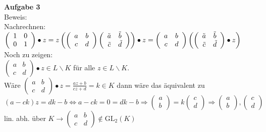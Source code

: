 \documentclass{article}
\begin{document}
\textbf{Aufgabe 3}\\
Beweis:\\
Nachrechnen: $\left(\begin{array}{cc}1 & 0 \\ 0 & 1\end{array}\right)\bullet z = z\\
\left(\left(\begin{array}{cc}a & b\\c & d\end{array}\right)\left(\begin{array}{cc}\tilde a & \tilde b \\ \tilde c & \tilde d\end{array}\right)\right)\bullet z = \left(\begin{array}{cc}a & b\\c & d\end{array}\right)\left(\left(\begin{array}{cc}\tilde a & \tilde b\\\tilde c &\tilde d\end{array}\right)\bullet z\right)$\\
Noch zu zeigen:\\
$\left(\begin{array}{cc}a & b\\c & d\end{array}\right)\bullet z \in L\backslash K$ für alle $z\in L\backslash K$.\\
Wäre $\left(\begin{array}{cc}a & b\\c & d\end{array}\right)\bullet z = \frac{az +b}{cz + d} = k\in K$ dann wäre das äquivalent zu\\
$(a-ck)z = dk-b \Leftrightarrow a-ck = 0 = dk-b \Rightarrow \left(\begin{array}{c}a\\b\end{array}\right) = k\left(\begin{array}{c}c\\d\end{array}\right) \Rightarrow \left(\begin{array}{c}a\\b\end{array}\right),\left(\begin{array}{c}c\\d\end{array}\right)$ lin. abh. über $K \rightarrow \left(\begin{array}{cc}a & b\\c & d\end{array}\right)\notin \text{GL}_2(K)$\\
\end{document}
